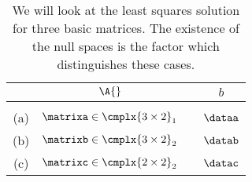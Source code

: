 \begin{table}[t]
	\begin{center}
		\begin{tabular}{cccc}
		  & $\A{}$ && $b$ \\\hline
		  &\\
		  (a) & $\matrixa\in\cmplx{3\times2}_{1}$ & \phantom{mm} & $\dataa$ \\[20pt]
		  (b) & $\matrixb\in\cmplx{3\times2}_{2}$ && $\datab$ \\[20pt]
		  (c) & $\matrixc\in\cmplx{2\times2}_{2}$ && $\datac$ \\[15pt]
		\end{tabular}
	\end{center}
	\caption{We will look at the least squares solution for three basic matrices. The existence of the null spaces is the factor which distinguishes these cases.}
\end{table}%

\endinput  %

